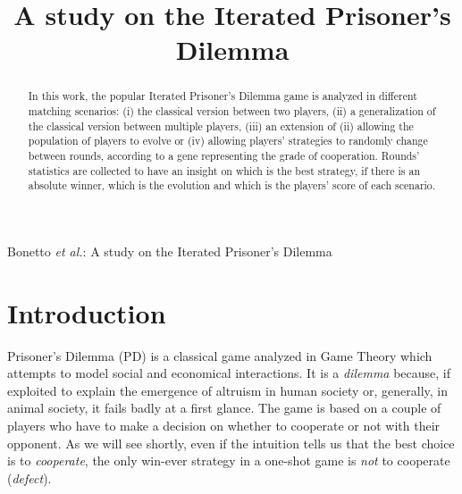 \documentclass[journal,10pt,twoside]{IEEEtran}
\begin{document}
\title{A study on the Iterated Prisoner's Dilemma}

\author{%

}
%
    {Bonetto \MakeLowercase{\textit{et al.}}: A study on the Iterated Prisoner's Dilemma}

\maketitle

\begin{abstract}
In this work, the popular Iterated Prisoner's Dilemma game is analyzed in different matching scenarios: (i) the classical version between two players, (ii) a generalization of the classical version between multiple players, (iii) an extension of (ii) allowing the population of players to evolve or (iv) allowing players' strategies to randomly change between rounds, according to a gene representing the grade of cooperation. %
Rounds' statistics are collected to have an insight on which is the best strategy, if there is an absolute winner, which is the evolution and which is the players' score of each scenario.
\end{abstract}

\section{Introduction} \label{s:intro}
 Prisoner's Dilemma (PD) is a classical game analyzed in Game Theory which attempts to model social and economical interactions. It is a \textit{dilemma} because, if exploited to explain the emergence of altruism in human society or, generally, in animal society, it fails badly at a first glance. The game is based on a couple of players who have to make a decision on whether to cooperate or not with their opponent. As we will see shortly, even if the intuition tells us that the best choice is to \textit{cooperate}, the only win-ever strategy in a one-shot game is  \textit{not} to cooperate (\textit{defect}).
\end{document}
